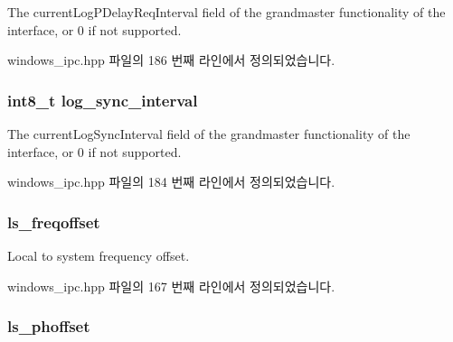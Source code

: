 The current\+Log\+P\+Delay\+Req\+Interval field of the grandmaster functionality of the interface, or 0 if not supported. 



windows\+\_\+ipc.\+hpp 파일의 186 번째 라인에서 정의되었습니다.

\subsubsection[{\texorpdfstring{log\+\_\+sync\+\_\+interval}{log_sync_interval}}]{\setlength{\rightskip}{0pt plus 5cm}int8\+\_\+t log\+\_\+sync\+\_\+interval}\hypertarget{class_offset_a2d4950b4c6da4dfa67688dcaf6139c9d}{}\label{class_offset_a2d4950b4c6da4dfa67688dcaf6139c9d}


The current\+Log\+Sync\+Interval field of the grandmaster functionality of the interface, or 0 if not supported. 



windows\+\_\+ipc.\+hpp 파일의 184 번째 라인에서 정의되었습니다.

\subsubsection[{\texorpdfstring{ls\+\_\+freqoffset}{ls_freqoffset}}]{ ls\+\_\+freqoffset}\hypertarget{class_offset_a396f365f5e7c66610f076359c5d99c6e}{}\label{class_offset_a396f365f5e7c66610f076359c5d99c6e}


Local to system frequency offset. 



windows\+\_\+ipc.\+hpp 파일의 167 번째 라인에서 정의되었습니다.

\subsubsection[{\texorpdfstring{ls\+\_\+phoffset}{ls_phoffset}}]{ ls\+\_\+phoffset}\hypertarget{class_offset_a092b9f356daa2757877b51e4084366be}{}\label{class_offset_a092b9f356daa2757877b51e4084366be}


